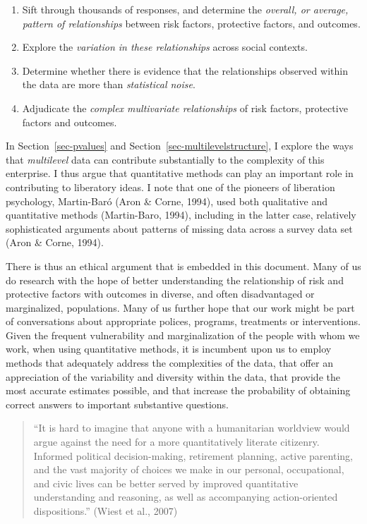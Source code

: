 \documentclass[
  letterpaper,
  DIV=11,
  numbers=noendperiod]{scrreprt}
\providecommand{\tightlist}{%
  \setlength{\itemsep}{0pt}\setlength{\parskip}{0pt}}\usepackage{longtable,booktabs,array}
\begin{document}
\begin{enumerate}
\def\labelenumi{\arabic{enumi}.}
\tightlist
\item
  Sift through thousands of responses, and determine the \emph{overall,
  or average, pattern of relationships} between risk factors, protective
  factors, and outcomes.
\item
  Explore the \emph{variation in these relationships} across social
  contexts.
\item
  Determine whether there is evidence that the relationships observed
  within the data are more than \emph{statistical noise}.
\item
  Adjudicate the \emph{complex multivariate relationships} of risk
  factors, protective factors and outcomes.
\end{enumerate}

In Section~\ref{sec-pvalues} and Section~\ref{sec-multilevelstructure},
I explore the ways that \emph{multilevel} data can contribute
substantially to the complexity of this enterprise. I thus argue that
quantitative methods can play an important role in contributing to
liberatory ideas. I note that one of the pioneers of liberation
psychology, Martin-Baró (Aron \& Corne, 1994), used both qualitative and
quantitative methods (Martin-Baro, 1994), including in the latter case,
relatively sophisticated arguments about patterns of missing data across
a survey data set (Aron \& Corne, 1994).

There is thus an ethical argument that is embedded in this document.
Many of us do research with the hope of better understanding the
relationship of risk and protective factors with outcomes in diverse,
and often disadvantaged or marginalized, populations. Many of us further
hope that our work might be part of conversations about appropriate
polices, programs, treatments or interventions. Given the frequent
vulnerability and marginalization of the people with whom we work, when
using quantitative methods, it is incumbent upon us to employ methods
that adequately address the complexities of the data, that offer an
appreciation of the variability and diversity within the data, that
provide the most accurate estimates possible, and that increase the
probability of obtaining correct answers to important substantive
questions.

\begin{quote}
``It is hard to imagine that anyone with a humanitarian worldview would
argue against the need for a more quantitatively literate citizenry.
Informed political decision-making, retirement planning, active
parenting, and the vast majority of choices we make in our personal,
occupational, and civic lives can be better served by improved
quantitative understanding and reasoning, as well as accompanying
action-oriented dispositions.'' (Wiest et al., 2007)
\end{quote}
\end{document}
